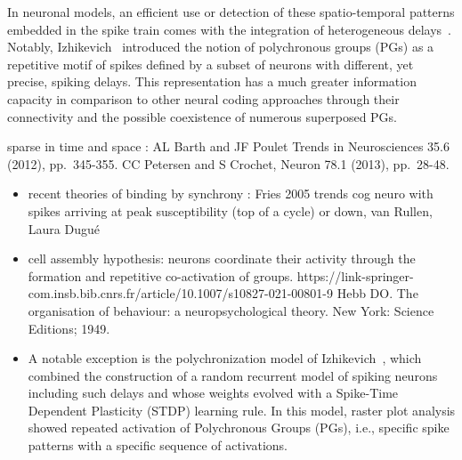 \documentclass[brainsci, %
               review,submit,pdftex,moreauthors%
               ]{Definitions/mdpi}
\begin{document}
In neuronal models, an efficient use or detection of these spatio-temporal patterns embedded in the spike train comes with the integration of heterogeneous delays~\citep{guise_bayesian_2014,zhang_supervised_2020}. Notably, Izhikevich~\citep{izhikevich_polychronization_2006} introduced the notion of polychronous groups (PGs) as a repetitive motif of spikes defined by a subset of neurons with different, yet precise, spiking delays. This representation has a much greater information capacity in comparison to other neural coding approaches through their connectivity and the possible coexistence of numerous superposed PGs.

sparse in time and space : AL Barth and JF Poulet Trends in Neurosciences 35.6 (2012), pp.~345-355. 
CC Petersen and S Crochet, Neuron 78.1 (2013), pp.~28-48.

\begin{itemize}
\item
  recent theories of binding by synchrony : Fries 2005 trends cog neuro with spikes arriving at peak susceptibility (top of a cycle) or down, van Rullen, Laura Dugué
\item
  cell assembly hypothesis: neurons coordinate their activity through the formation and repetitive co-activation of groups. https://link-springer-com.insb.bib.cnrs.fr/article/10.1007/s10827-021-00801-9 Hebb DO. The organisation of behaviour: a neuropsychological theory. New York: Science Editions; 1949.
\item
  A notable exception is the polychronization model of Izhikevich~\citep{izhikevich_polychronization_2006}, which combined the construction of a random recurrent model of spiking neurons including such delays and whose weights evolved with a Spike-Time Dependent Plasticity (STDP) learning rule. In this model, raster plot analysis showed repeated activation of Polychronous Groups (PGs), i.e., specific spike patterns with a specific sequence of activations.
\end{itemize}

\end{document}
